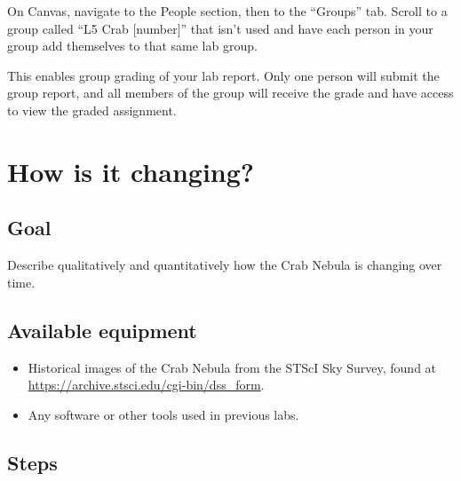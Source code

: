 \begin{steps}
	\item On Canvas, navigate to the People section, then to the ``Groups'' tab. Scroll to a group called ``L5 Crab [number]'' that isn't used and have each person in your group add themselves to that same lab group.
\end{steps}

This enables group grading of your lab report. Only one person will submit the group report, and all members of the group will receive the grade and have access to view the graded assignment.

\section{How is it changing?}

\subsection{Goal}

Describe qualitatively and quantitatively how the Crab Nebula is changing over time.

\subsection{Available equipment}

\begin{itemize}
	
	\item Historical images of the Crab Nebula from the STScI Sky Survey, found at \url{https://archive.stsci.edu/cgi-bin/dss_form}.
	
	\item Any software or other tools used in previous labs.
\end{itemize}

\subsection{Steps}

